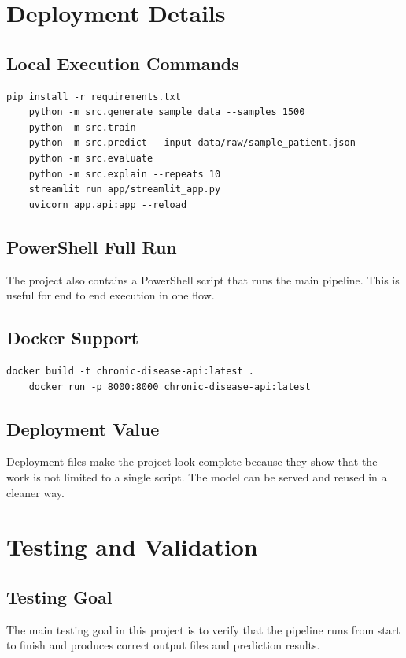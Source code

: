 \documentclass[12pt,a4paper,openany]{report}
\begin{document}
    \chapter{Deployment Details}
    \section{Local Execution Commands}
    \begin{lstlisting}[style=shellstyle,caption={Project execution commands}]
    pip install -r requirements.txt
    python -m src.generate_sample_data --samples 1500
    python -m src.train
    python -m src.predict --input data/raw/sample_patient.json
    python -m src.evaluate
    python -m src.explain --repeats 10
    streamlit run app/streamlit_app.py
    uvicorn app.api:app --reload
    \end{lstlisting}

    \section{PowerShell Full Run}
    The project also contains a PowerShell script that runs the main pipeline. This is useful for end to end execution in one flow.

    \section{Docker Support}
    \begin{lstlisting}[style=shellstyle,caption={Docker commands}]
    docker build -t chronic-disease-api:latest .
    docker run -p 8000:8000 chronic-disease-api:latest
    \end{lstlisting}

    \section{Deployment Value}
    Deployment files make the project look complete because they show that the work is not limited to a single script. The model can be served and reused in a cleaner way.

    \chapter{Testing and Validation}
    \section{Testing Goal}
    The main testing goal in this project is to verify that the pipeline runs from start to finish and produces correct output files and prediction results.
\end{document}
